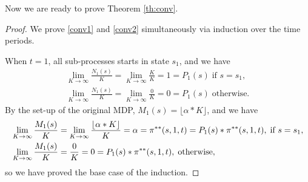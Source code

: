 Now we are ready to prove Theorem \ref{th:conv}.
\begin{proof}{}
We prove \eqref{conv1} and \eqref{conv2} simultaneously via induction over the time periods.

When $t=1$, all sub-processes starts in state $s_1$, and we have
\begin{align*}
\lim_{K\rightarrow \infty}\frac{N_1(s)}{K} = \lim_{K\rightarrow \infty}\frac{K}{K} = 1 = P_1(s) \; \text{if }s = s_1,\\
\lim_{K\rightarrow \infty}\frac{N_1(s)}{K} = \lim_{K\rightarrow \infty}\frac{0}{K} = 0 = P_1(s) \; \text{otherwise}.
\end{align*}
By the set-up of the original MDP, $M_1(s)=\lfloor\alpha * K\rfloor$, and we have
\begin{align*}
&\lim_{K\rightarrow \infty}\frac{M_1(s)}{K} = \lim_{K\rightarrow \infty}\frac{\lfloor\alpha*K\rfloor}{K} = \alpha = \pi^{**}(s,1,t) =  P_1(s)*\pi^{**}(s,1,t) , \; \text{if }s = s_1,\\
&\lim_{K\rightarrow \infty}\frac{M_1(s)}{K} = \frac{0}{K} = 0 = P_1(s)*\pi^{**}(s,1,t), \; \text{otherwise},
\end{align*} 
so we have proved the base case of the induction. 


\end{proof}
